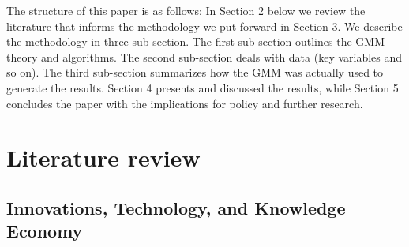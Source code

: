 \documentclass[11pt]{article}
\begin{document}
The structure of this paper is as follows: In Section 2 below we review the literature that informs the methodology we put forward in Section 3. We describe the methodology in three sub-section. The first sub-section outlines the GMM theory and algorithms. The second sub-section deals with data (key variables and so on). The third sub-section summarizes how the GMM was actually used to generate the results. Section 4 presents and discussed the results, while Section 5 concludes the paper with the implications for policy and further research.


\section{Literature review}
\subsection{Innovations, Technology, and Knowledge Economy}
\end{document}
